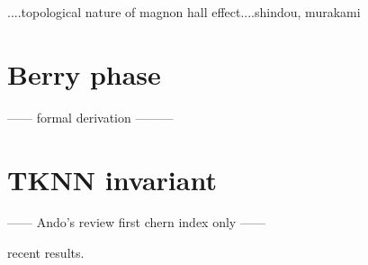 ....topological nature of magnon hall effect....shindou, murakami

\section{Berry phase}
------ formal derivation ---------
\section{TKNN invariant}
------ Ando's review first chern index only ------

recent results.
 
\setcounter{equation}{0}
\setcounter{table}{0}
\setcounter{figure}{0}


    



